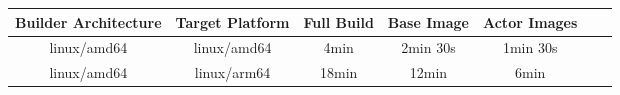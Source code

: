 \begin{figure}[t]
    \begin{changemargin}{0cm}{0cm}
        \centering
        \begin{tabular}{|c|c|c|c|c|c|c|}
            \hline
            \textbf{Builder Architecture} & \textbf{Target Platform} & \textbf{Full Build} & \textbf{Base Image} & \textbf{Actor Images} \\
            \hline
            linux/amd64 & linux/amd64 & 4min & 2min 30s & 1min 30s \\
            \hline
            linux/amd64 & linux/arm64 & 18min & 12min & 6min \\
            \hline
        \end{tabular}
        \label{table:sklearn_mnist_multi_platform_build_example}
    \end{changemargin}
\end{figure}